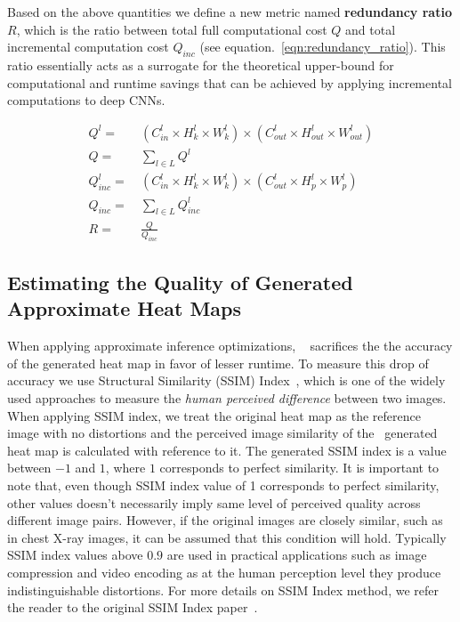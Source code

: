 Based on the above quantities we define a new metric named \textbf{redundancy ratio} $R$, which is the ratio between total full computational cost $Q$ and total incremental computation cost $Q_{inc}$ (see equation.~\ref{eqn:redundancy_ratio}). This ratio essentially acts as a surrogate for the theoretical upper-bound for computational and runtime savings that can be achieved by applying incremental computations to deep CNNs.

\begin{align}
\label{eqn:full_local}
Q^l =&~ (C^l_{in} \times H^l_{k} \times W^l_{k}) \times (C^l_{out} \times H^l_{out} \times W^l_{out})\\
\label{eqn:full_all}
Q =&~ \sum_{l \in L} Q^l\\
\label{eqn:inc_local}
Q_{inc}^l =&~ (C^l_{in} \times H^l_{k} \times W^l_{k}) \times (C^l_{out} \times H^l_{p} \times W^l_{p})\\
\label{eqn:inc_all}
Q_{inc} =&~ \sum_{l \in L} Q^l_{inc}\\
\label{eqn:redundancy_ratio}
R =&~ \frac{Q}{Q_{inc}}
\end{align}

\subsection{Estimating the Quality of Generated Approximate Heat Maps}

When applying approximate inference optimizations, \system~ sacrifices the the accuracy of the generated heat map in favor of lesser runtime.
To measure this drop of accuracy we use Structural Similarity (SSIM) Index~\cite{wang2004image}, which is one of the widely used approaches to measure the \textit{human perceived difference} between two images.
When applying SSIM index, we treat the original heat map as the reference image with no distortions and the perceived image similarity of the \system~generated heat map is calculated with reference to it.
The generated SSIM index is a value between $-1$ and $1$, where $1$ corresponds to perfect similarity.
It is important to note that, even though SSIM index value of 1 corresponds to perfect similarity, other values doesn't necessarily imply same level of perceived quality across different image pairs.
However, if the original images are closely similar, such as in chest X-ray images, it can be assumed that this condition will hold.
Typically SSIM index values above $0.9$ are used in practical applications such as image compression and video encoding as at the human perception level they produce indistinguishable distortions.
For more details on SSIM Index method, we refer the reader to the original SSIM Index paper~\cite{wang2004image}.



